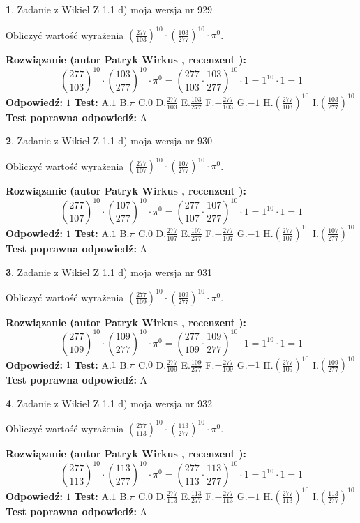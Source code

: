 \documentclass[12pt, a4paper]{article}
\theoremstyle{definition} %
\newtheorem{zad}{}
\newcommand{\zadStart}[1]{\begin{zad}#1\newline}
\newcommand{\zadStop}{\end{zad}}
\newcommand{\rozwStart}[2]{\noindent \textbf{Rozwiązanie (autor #1 , recenzent #2): }\newline}
\newcommand{\rozwStop}{\newline}
\newcommand{\odpStart}{\noindent \textbf{Odpowiedź:}\newline}
\newcommand{\odpStop}{\newline}
\newcommand{\testStart}{\noindent \textbf{Test:}\newline}
\newcommand{\testStop}{\newline}
\newcommand{\kluczStart}{\noindent \textbf{Test poprawna odpowiedź:}\newline}
\newcommand{\kluczStop}{\newline}
\begin{document}
\zadStart{Zadanie z Wikieł Z 1.1 d) moja wersja nr 929}

Obliczyć wartość wyrażenia $(\frac{277}{103})^{10} \cdot (\frac{103}{277})^{10} \cdot \pi^{0}$.
\zadStop
\rozwStart{Patryk Wirkus}{}
$$(\frac{277}{103})^{10} \cdot (\frac{103}{277})^{10} \cdot \pi^{0} = (\frac{277}{103} \cdot \frac{103}{277})^{10} \cdot 1 = 1^{10} \cdot 1 = 1$$
\rozwStop
\odpStart
$1$
\odpStop
\testStart
A.$1$ B.$\pi$ C.$0$ D.$\frac{277}{103}$ E.$\frac{103}{277}$
F.$-\frac{277}{103}$ G.$-1$
H.$(\frac{277}{103})^{10}$
I.$(\frac{103}{277})^{10}$
\testStop
\kluczStart
A
\kluczStop



\zadStart{Zadanie z Wikieł Z 1.1 d) moja wersja nr 930}

Obliczyć wartość wyrażenia $(\frac{277}{107})^{10} \cdot (\frac{107}{277})^{10} \cdot \pi^{0}$.
\zadStop
\rozwStart{Patryk Wirkus}{}
$$(\frac{277}{107})^{10} \cdot (\frac{107}{277})^{10} \cdot \pi^{0} = (\frac{277}{107} \cdot \frac{107}{277})^{10} \cdot 1 = 1^{10} \cdot 1 = 1$$
\rozwStop
\odpStart
$1$
\odpStop
\testStart
A.$1$ B.$\pi$ C.$0$ D.$\frac{277}{107}$ E.$\frac{107}{277}$
F.$-\frac{277}{107}$ G.$-1$
H.$(\frac{277}{107})^{10}$
I.$(\frac{107}{277})^{10}$
\testStop
\kluczStart
A
\kluczStop



\zadStart{Zadanie z Wikieł Z 1.1 d) moja wersja nr 931}

Obliczyć wartość wyrażenia $(\frac{277}{109})^{10} \cdot (\frac{109}{277})^{10} \cdot \pi^{0}$.
\zadStop
\rozwStart{Patryk Wirkus}{}
$$(\frac{277}{109})^{10} \cdot (\frac{109}{277})^{10} \cdot \pi^{0} = (\frac{277}{109} \cdot \frac{109}{277})^{10} \cdot 1 = 1^{10} \cdot 1 = 1$$
\rozwStop
\odpStart
$1$
\odpStop
\testStart
A.$1$ B.$\pi$ C.$0$ D.$\frac{277}{109}$ E.$\frac{109}{277}$
F.$-\frac{277}{109}$ G.$-1$
H.$(\frac{277}{109})^{10}$
I.$(\frac{109}{277})^{10}$
\testStop
\kluczStart
A
\kluczStop



\zadStart{Zadanie z Wikieł Z 1.1 d) moja wersja nr 932}

Obliczyć wartość wyrażenia $(\frac{277}{113})^{10} \cdot (\frac{113}{277})^{10} \cdot \pi^{0}$.
\zadStop
\rozwStart{Patryk Wirkus}{}
$$(\frac{277}{113})^{10} \cdot (\frac{113}{277})^{10} \cdot \pi^{0} = (\frac{277}{113} \cdot \frac{113}{277})^{10} \cdot 1 = 1^{10} \cdot 1 = 1$$
\rozwStop
\odpStart
$1$
\odpStop
\testStart
A.$1$ B.$\pi$ C.$0$ D.$\frac{277}{113}$ E.$\frac{113}{277}$
F.$-\frac{277}{113}$ G.$-1$
H.$(\frac{277}{113})^{10}$
I.$(\frac{113}{277})^{10}$
\testStop
\kluczStart
A
\kluczStop
\end{document}
